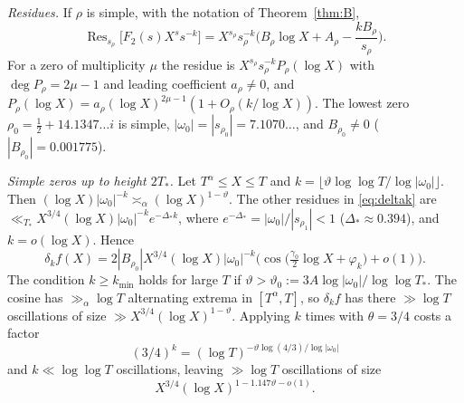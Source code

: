 \documentclass[11pt]{amsart}
\theoremstyle{remark}
\DeclareMathOperator{\Res}{Res}
\begin{document}
\emph{Residues.} If $\rho$ is simple, with the notation of Theorem~\ref{thm:B},
\[
\Res_{s_\rho}\big[F_2(s)X^ss^{-k}\big]=X^{s_\rho}s_\rho^{-k}\Big(B_\rho\log X+A_\rho-\frac{kB_\rho}{s_\rho}\Big).
\]
For a zero of multiplicity $\mu$ the residue is $X^{s_\rho}s_\rho^{-k}P_\rho(\log X)$ with $\deg P_\rho=2\mu-1$ and leading coefficient $a_\rho\ne0$, and $P_\rho(\log X)=a_\rho(\log X)^{2\mu-1}(1+O_\rho(k/\log X))$. The lowest zero $\rho_0=\tfrac12+14.1347\ldots i$ is simple, $|\omega_0|=|s_{\rho_0}|=7.1070\ldots$, and $B_{\rho_0}\ne0$ ($|B_{\rho_0}|=0.001775$).

\emph{Simple zeros up to height $2T_*$.} Let $T^\alpha\le X\le T$ and $k=\lfloor\vartheta\log\log T/\log|\omega_0|\rfloor$. Then $(\log X)|\omega_0|^{-k}\asymp_\alpha(\log X)^{1-\vartheta}$. The other residues in \eqref{eq:deltak} are $\ll_{T_*}X^{3/4}(\log X)|\omega_0|^{-k}e^{-\Delta_* k}$, where $e^{-\Delta_*}=|\omega_0|/|s_{\rho_1}|<1$ ($\Delta_*\approx0.394$), and $k=o(\log X)$. Hence
\[
\delta_kf(X)=2|B_{\rho_0}|X^{3/4}(\log X)|\omega_0|^{-k}\Big(\cos\big(\tfrac{\gamma_0}{2}\log X+\varphi_k\big)+o(1)\Big).
\]
The condition $k\ge k_{\min}$ holds for large $T$ if $\vartheta>\vartheta_0:=3A\log|\omega_0|/\log\log T_*$. The cosine has $\gg_\alpha\log T$ alternating extrema in $[T^\alpha,T]$, so $\delta_kf$ has there $\gg\log T$ oscillations of size $\gg X^{3/4}(\log X)^{1-\vartheta}$. Applying \cite[Lemma~5.4]{KW09} $k$ times with $\theta=3/4$ costs a factor
\[
(3/4)^k=(\log T)^{-\vartheta\log(4/3)/\log|\omega_0|}
\]
and $k\ll\log\log T$ oscillations, leaving $\gg\log T$ oscillations of size
\[
X^{3/4}(\log X)^{1-1.147\vartheta-o(1)}.
\]
\end{document}
